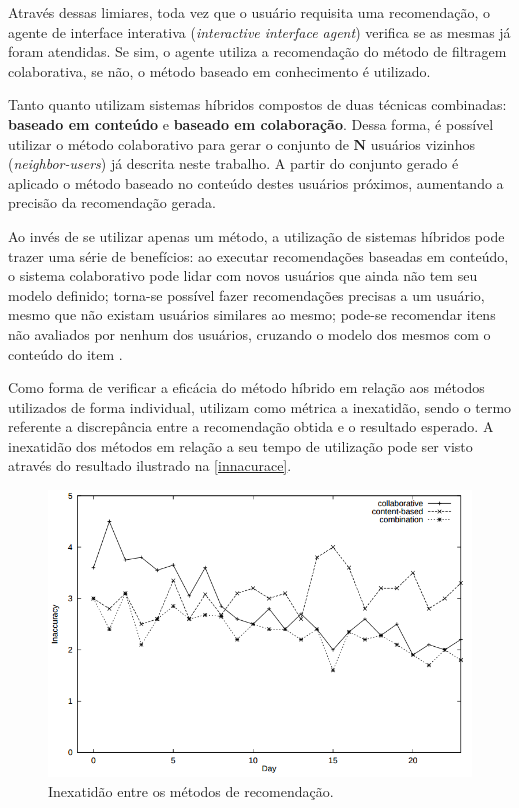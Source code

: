 Através dessas limiares, toda vez que o usuário requisita uma recomendação, o agente de interface interativa (\textit{interactive interface agent}) verifica se as mesmas já foram atendidas. Se sim, o agente utiliza a recomendação do método de filtragem colaborativa, se não, o método baseado em conhecimento é utilizado.

Tanto  quanto  utilizam sistemas híbridos compostos de duas técnicas combinadas: \textbf{baseado em conteúdo} e \textbf{baseado em colaboração}. Dessa forma, é possível utilizar o método colaborativo para gerar o conjunto de $\textbf{N}$ usuários vizinhos (\textit{neighbor-users}) já descrita neste trabalho. A partir do conjunto gerado é aplicado o método baseado no conteúdo destes usuários próximos, aumentando a precisão da recomendação gerada.

Ao invés de se utilizar apenas um método, a utilização de sistemas híbridos pode trazer uma série de benefícios: ao executar recomendações baseadas em conteúdo, o sistema colaborativo pode lidar com novos usuários que ainda não tem seu modelo definido; torna-se possível fazer recomendações precisas a um usuário, mesmo que não existam usuários similares ao mesmo; pode-se recomendar itens não avaliados por nenhum dos usuários, cruzando o modelo dos mesmos com o conteúdo do item \cite{balabanovic1997fab}.

Como forma de verificar a eficácia do método híbrido em relação aos métodos utilizados de forma individual,  utilizam como métrica a inexatidão, sendo o termo referente a discrepância entre a recomendação obtida e o resultado esperado. A inexatidão dos métodos em relação a seu tempo de utilização pode ser visto através do resultado ilustrado na \autoref{innacurace}.

\begin{figure}[h!tp]
	\caption{\label{innacurace}Inexatidão entre os métodos de recomendação.}
	\begin{center}
		\includegraphics[scale=0.8]{images/innacurace.png}
	\end{center}
\end{figure}

